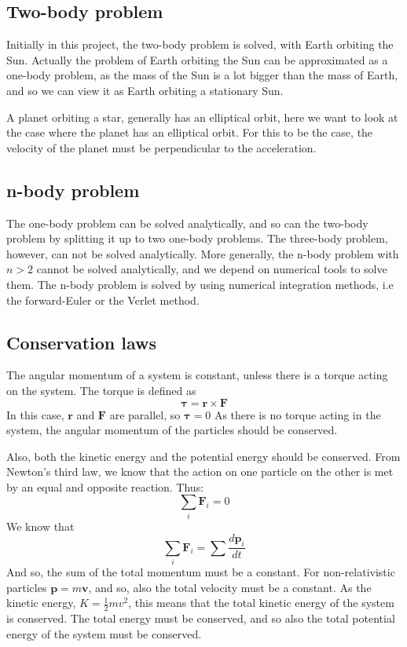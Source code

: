 \subsection{Two-body problem}

Initially in this project, the two-body problem is solved, with Earth orbiting the Sun. Actually the problem of Earth orbiting the Sun can be approximated as a one-body problem, as the mass of the Sun is a lot bigger than the mass of Earth, and so we can view it as Earth orbiting a stationary Sun. 

A planet orbiting a star, generally has an elliptical orbit, here we want to look at the case where the planet has an elliptical orbit. For this to be the case, the velocity of the planet must be perpendicular to the acceleration. 



\subsection{n-body problem}
The one-body problem can be solved analytically, and so can the two-body problem by splitting it up to two one-body problems. The three-body problem, however, can not be solved analytically. More generally, the n-body problem with $n>2$ cannot be solved analytically, and we depend on numerical tools to solve them. The n-body problem is solved by using numerical integration methods, i.e the forward-Euler or the Verlet method. 

\subsection{Conservation laws}\label{sec:cons}

The angular momentum of a system is constant, unless there is a torque acting on the system. The torque is defined as 
\begin{equation}
\mathbf{\tau} = \mathbf{r}  \times \mathbf{F}
\end{equation}
In this case, $\mathbf{r}$ and $\mathbf{F}$ are parallel, so $\mathbf{\tau} = 0$
As there is no torque acting in the system, the angular momentum of the particles should be conserved. 

Also, both the kinetic energy and the potential energy should be conserved. 
From Newton's third law, we know that the action on one particle on the other is met by an equal and opposite reaction. Thus:
\begin{equation}
\sum_i \mathbf{F}_i  = 0
\end{equation}
We know that 
\begin{equation}
\sum_i \mathbf{F}_i = \sum\frac{d\mathbf{p}_i}{dt}
\end{equation}
And so, the sum of the total momentum must be a constant. For non-relativistic particles $\mathbf{p}= m\mathbf{v}$, and so, also the total velocity must be a constant. As the kinetic energy, $K = \frac{1}{2}mv^2$, this means that the total kinetic energy of the system is conserved. The total energy must be conserved, and so also the total potential energy of the system must be conserved. 
